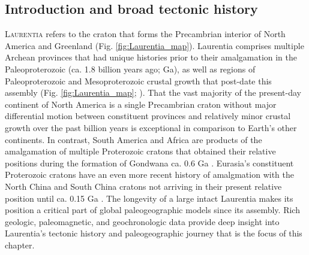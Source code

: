 \documentclass[twocolumn, switch]{article} %
\begin{document}
\subsection{Introduction and broad tectonic history}
\lettrine[lines=2]{L}{aurentia} refers to the craton that forms the Precambrian interior of North America and Greenland (Fig. \ref{fig:Laurentia_map}). Laurentia comprises multiple Archean provinces that had unique histories prior to their amalgamation in the Paleoproterozoic (ca. 1.8 billion years ago; Ga), as well as regions of Paleoproterozoic and Mesoproterozoic crustal growth that post-date this assembly (Fig. \ref{fig:Laurentia_map}; \citealp{Hoffman1989c, Whitmeyer2007a}). That the vast majority of the present-day continent of North America is a single Precambrian craton without major differential motion between constituent provinces and relatively minor crustal growth over the past billion years is exceptional in comparison to Earth's other continents. In contrast, South America and Africa are products of the amalgamation of multiple Proterozoic cratons that obtained their relative positions during the formation of Gondwana ca. 0.6 Ga \citep{Goscombe2019a}. Eurasia's constituent Proterozoic cratons have an even more recent history of amalgmation with the North China and South China cratons not arriving in their present relative position until ca. 0.15 Ga \citep{Van-der-Voo2015a,Torsvik2017a}. The longevity of a large intact Laurentia makes its position a critical part of global paleogeographic models since its assembly. Rich geologic, paleomagnetic, and geochronologic data provide deep insight into Laurentia's tectonic history and paleogeographic journey that is the focus of this chapter.
\end{document}

